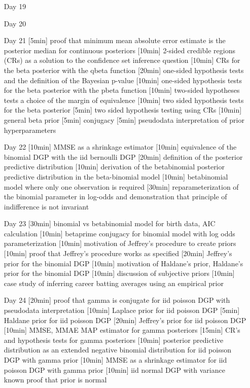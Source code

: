 \begin{enumerate}
\item[Day 19] 
\item[Day 20] 

\item[Day 21] [5min] proof that minimum mean absolute error estimate is the posterior median for continuous posteriors [10min] 2-sided credible regions (CRs) as a solution to the confidence set inference question [10min] CRs for the beta posterior with the qbeta function [20min] one-sided hypothesis tests and the definition of the Bayesian p-value [10min] one-sided hypothesis tests for the beta posterior with the pbeta function [10min] two-sided hypotheses tests a choice of the margin of equivalence [10min] two sided hypothesis tests for the beta posterior [5min] two sided hypothesis testing using CRs [10min] general beta prior [5min] conjugacy [5min] pseudodata interpretation of prior hyperparameters 

\item[Day 22] [10min] MMSE as a shrinkage estimator [10min] equivalence of the binomial DGP with the iid bernoulli DGP [20min] definition of the posterior predictive distribution [10min] derivation of the betabinomial posterior predictive distribution in the beta-binomial model [10min] betabinomial model where only one observation is required [30min] reparameterization of the binomial parameter in log-odds and demonstration that principle of indifference is not invariant

\item[Day 23] [30min] binomial vs betabinomial model for birth data, AIC calculation [10min] betaprime conjugacy for binomial model with log odds parameterization [10min] motivation of Jeffrey's procedure to create priors [10min] proof that Jeffrey's procedure works as specified [20min] Jeffrey's prior for the binomial DGP [10min] motivation of Haldane's prior, Haldane's prior for the binomial DGP [10min] discussion of subjective priors [10min] case study of inferring career batting averages using an empirical prior

\item[Day 24] [20min] proof that gamma is conjugate for iid poisson DGP with pseudodata interpretation [10min] Laplace prior for iid poisson DGP [5min] Haldane prior for iid poisson DGP  [20min] Jeffrey's prior for iid poisson DGP [10min] MMSE, MMAE MAP estimator for gamma posteriors [15min] CR's and hypothesis tests for gamma posteriors [10min] posterior predictive distribution as an extended negative binomial distribution for iid poisson DGP with gamma prior [10min] MMSE as a shrinkage estimator for iid poisson DGP with gamma prior [10min] iid normal DGP with variance known proof that prior is normal 


\end{enumerate}
